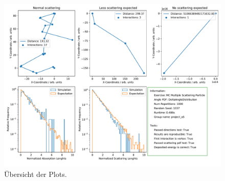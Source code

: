 \begin{figure}
    \centering
    \includegraphics[width=\textwidth]{Aufgabe10/exercise_mc_multiple_scattering.pdf}
    \caption{Übersicht der Plots.}
    \label{fig:mcmultiplescattering}
\end{figure}